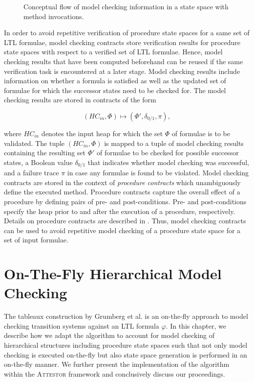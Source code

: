 \documentclass[a4paper, 12pt, twoside]{report}
\begin{document}
\begin{figure}
\begin{center}
{\begin{tikzpicture}
				\end{tikzpicture}}
			\caption{Conceptual flow of model checking information in a state space with method invocations.}\label{fig:otf_hierarchy}
		\end{center}
	\end{figure}	

	In order to avoid repetitive verification of procedure state spaces for a same set of LTL formulae, model checking contracts store verification results for procedure state spaces with respect to a verified set of LTL formulae. Hence, model checking results that have been computed beforehand can be reused if the same verification task is encountered at a later stage. Model checking results include information on whether a formula is satisfied as well as the updated set of formulae for which the successor states need to be checked for. The model checking results are stored in contracts of the form
	
	\[(HC_{in}, \Phi) \mapsto (\Phi', \delta_{0/1}, \pi),\]
	
	where $HC_{in}$ denotes the input heap for which the set $\Phi$ of formulae is to be validated. The tuple $(HC_{in}, \Phi)$ is mapped to a tuple of model checking results containing the resulting set $\Phi'$ of formulae to be checked for possible successor states, a Boolean value $\delta_{0/1}$ that indicates whether model checking was successful, and a failure trace $\pi$ in case any formulae is found to be violated. Model checking contracts are stored in the context of \textit{procedure contracts} which unambiguously define the executed method. Procedure contracts capture the overall effect of a procedure by defining pairs of pre- and post-conditions. Pre- and post-conditions specify the heap prior to and after the execution of a procedure, respectively. Details on procedure contracts are described in \cite{jansen2014generating}. Thus, model checking contracts can be used to avoid repetitive model checking of a procedure state space for a set of input formulae.
	
	\chapter{On-The-Fly Hierarchical Model Checking}\label{chp:otf}
	
	The tableaux construction by Grumberg et al. \cite{bhat1995efficient} is an on-the-fly approach to model checking transition systems against an LTL formula $\varphi$. In this chapter, we describe how we adapt the algorithm to account for model checking of hierarchical structures including procedure state spaces such that not only model checking is executed on-the-fly but also state space generation is performed in an on-the-fly manner. We further present the implementation of the algorithm within the \textsc{Attestor} framework and conclusively discuss our proceedings.
	
\end{document}

